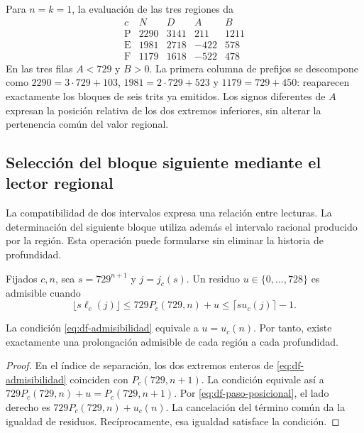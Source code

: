 \begin{example}
Para \(n=k=1\), la evaluación de las tres regiones da
\[
\begin{array}{c|rr|rr}
 c&N&D&A&B\\\hline
 \mathrm P&2290&3141&211&1211\\
 \mathrm E&1981&2718&-422&578\\
 \mathrm F&1179&1618&-522&478
\end{array}
\]
En las tres filas \(A<729\) y \(B>0\). La primera columna de prefijos
se descompone como \(2290=3\cdot729+103\),
\(1981=2\cdot729+523\) y \(1179=729+450\): reaparecen exactamente los
bloques de seis trits ya emitidos. Los signos diferentes de \(A\) expresan
la posición relativa de los dos extremos inferiores, sin alterar la
pertenencia común del valor regional.
\end{example}

\subsection{Selección del bloque siguiente mediante el lector regional}

La compatibilidad de dos intervalos expresa una relación entre lecturas.
La determinación del siguiente bloque utiliza además el intervalo racional
producido por la región. Esta operación puede formularse sin eliminar la
historia de profundidad.

\begin{definition}
Fijados \(c,n\), sea \(s=729^{n+1}\) y \(j=j_c(s)\). Un residuo
\(u\in\{0,\ldots,728\}\) es admisible cuando
\begin{equation}
 \lfloor s\ell_c(j)\rfloor
 \leq729P_c(729,n)+u
 \leq\lceil su_c(j)\rceil-1.
 \label{eq:df-admisibilidad}
\end{equation}
\end{definition}

\begin{theorem}
\label{thm:df-prolongacion-unica}
La condición \eqref{eq:df-admisibilidad} equivale a \(u=u_c(n)\).
Por tanto, existe exactamente una prolongación admisible de cada región
a cada profundidad.
\end{theorem}

\begin{proof}
En el índice de separación, los dos extremos enteros de
\eqref{eq:df-admisibilidad} coinciden con \(P_c(729,n+1)\).
La condición equivale así a
\(729P_c(729,n)+u=P_c(729,n+1)\).
Por \eqref{eq:df-paso-posicional}, el lado derecho es
\(729P_c(729,n)+u_c(n)\). La cancelación del término común da la
igualdad de residuos. Recíprocamente, esa igualdad satisface la condición.
\end{proof}

